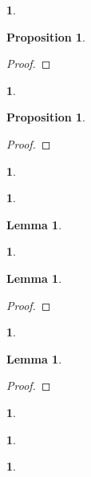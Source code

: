 \documentclass{article}
\newtheorem{env}[term]{}
\newtheorem{proposition}[term]{Proposition}
\newtheorem{lemma}[term]{Lemma}
\begin{document}
\begin{env}
\end{env}
 
\begin{proposition}
\end{proposition}

\begin{proof}
\end{proof}

\begin{env}
\end{env}

\begin{proposition}
\end{proposition}

\begin{proof}
\end{proof}

\begin{env}
\end{env}

\begin{env}
\end{env}

\begin{lemma}
\end{lemma}

\begin{env}
\end{env}

\begin{lemma}
\end{lemma}

\begin{proof}
\end{proof}

\begin{env}
\end{env}

\begin{lemma}
\end{lemma}

\begin{proof}
\end{proof}

\begin{env}
\end{env}

\begin{env}
\end{env}

\begin{env}
\end{env}
\end{document}
